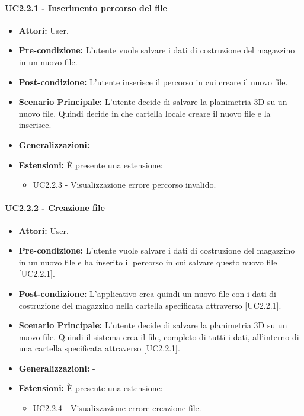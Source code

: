 \paragraph{UC2.2.1 - Inserimento percorso del file}
\begin{itemize}
    \item \textbf{Attori:} User.
    \item \textbf{Pre-condizione:} L'utente vuole salvare i dati di costruzione del magazzino in un nuovo file.
    \item \textbf{Post-condizione:} L'utente inserisce il percorso in cui creare il nuovo file.
    \item \textbf{Scenario Principale:} L'utente decide di salvare la planimetria 3D su un nuovo file. Quindi decide in che cartella locale creare il nuovo file e la inserisce.
    \item \textbf{Generalizzazioni:} -
    \item \textbf{Estensioni:} È presente una estensione:
    \begin{itemize}
        \item UC2.2.3 - Visualizzazione errore percorso invalido.
    \end{itemize}
\end{itemize}


\paragraph{UC2.2.2 - Creazione file}
\begin{itemize}
    \item \textbf{Attori:} User.
    \item \textbf{Pre-condizione:}  L'utente vuole salvare i dati di costruzione del magazzino in un nuovo file e ha inserito il percorso in cui salvare questo nuovo file [UC2.2.1].
    \item \textbf{Post-condizione:} L'applicativo crea quindi un nuovo file con i dati di costruzione del magazzino nella cartella specificata attraverso [UC2.2.1].
    \item \textbf{Scenario Principale:} L'utente decide di salvare la planimetria 3D su un nuovo file. Quindi il sistema crea il file, completo di tutti i dati, all'interno di una cartella specificata attraverso [UC2.2.1].
    \item \textbf{Generalizzazioni:} -
    \item \textbf{Estensioni:} È presente una estensione:
    \begin{itemize}
        \item UC2.2.4 - Visualizzazione errore creazione file.
    \end{itemize}    
\end{itemize}


